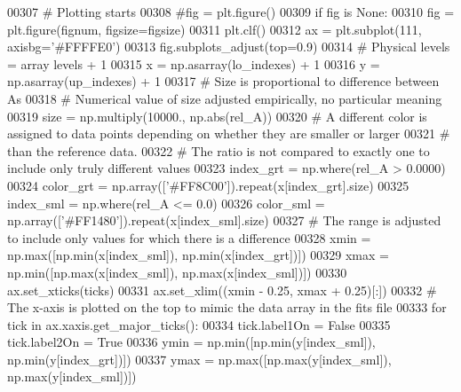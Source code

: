 \begin{DoxyCode}
{{{00307                     \textcolor{comment}{# Plotting starts}
00308                     \textcolor{comment}{#fig = plt.figure()}
00309                     \textcolor{keywordflow}{if} fig \textcolor{keywordflow}{is} \textcolor{keywordtype}{None}:
00310                         fig = plt.figure(fignum, figsize=figsize)
00311                     plt.clf()
00312                     ax = plt.subplot(111, axisbg=\textcolor{stringliteral}{'#FFFFE0'})
00313                     fig.subplots\_adjust(top=0.9)
00314                     \textcolor{comment}{# Physical levels = array levels + 1}
00315                     x = np.asarray(lo\_indexes) + 1
00316                     y = np.asarray(up\_indexes) + 1
00317                     \textcolor{comment}{# Size is proportional to difference between As}
00318                     \textcolor{comment}{# Numerical value of size adjusted empirically, no particular meaning }
00319                     size = np.multiply(10000., np.abs(rel\_A))
00320                     \textcolor{comment}{# A different color is assigned to data points depending on whether they are smaller or
       larger}
00321                     \textcolor{comment}{# than the reference data.}
00322                     \textcolor{comment}{# The ratio is not compared to exactly one to include only truly different values  }
00323                     index\_grt = np.where(rel\_A > 0.0000)
00324                     color\_grt = np.array([\textcolor{stringliteral}{'#FF8C00'}]).repeat(x[index\_grt].size)
00325                     index\_sml = np.where(rel\_A <= 0.0)
00326                     color\_sml = np.array([\textcolor{stringliteral}{'#FF1480'}]).repeat(x[index\_sml].size)
00327                     \textcolor{comment}{# The range is adjusted to include only values for which there is a difference}
00328                     xmin = np.max([np.min(x[index\_sml]), np.min(x[index\_grt])])
00329                     xmax = np.min([np.max(x[index\_sml]), np.max(x[index\_sml])])
00330                     ax.set\_xticks(ticks)
00331                     ax.set\_xlim((xmin - 0.25, xmax + 0.25)[:])
00332                     \textcolor{comment}{# The x-axis is plotted on the top to mimic the data array in the fits file}
00333                     \textcolor{keywordflow}{for} tick \textcolor{keywordflow}{in} ax.xaxis.get\_major\_ticks():
00334                         tick.label1On = \textcolor{keyword}{False}
00335                         tick.label2On = \textcolor{keyword}{True}
00336                     ymin = np.min([np.min(y[index\_sml]), np.min(y[index\_grt])])
00337                     ymax = np.max([np.max(y[index\_sml]), np.max(y[index\_sml])])
}}}
\end{DoxyCode}
